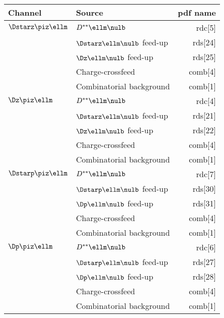 \documentclass[6pt]{article}
\begin{document}
\begin{tabular}{l l r}\\ \hline\hline
Channel          & Source  & pdf name\\ \hline
$\Dstarz\piz\ellm$ & $D^{**}\ellm\nulb$                & rdc[5] \\
              & $\Dstarz\ellm\nulb$ feed-up            & rds[24] \\
              & $\Dz\ellm\nulb$ feed-up                & rds[25] \\
              & Charge-crossfeed                       & comb[4] \\
              & Combinatorial background               & comb[1] \\ \hline
$\Dz\piz\ellm$     & $D^{**}\ellm\nulb$                & rdc[4] \\
              & $\Dstarz\ellm\nulb$ feed-up            & rds[21]  \\
              & $\Dz\ellm\nulb$ feed-up                & rds[22] \\
              & Charge-crossfeed                       & comb[4] \\
              & Combinatorial background               & comb[1] \\ \hline
$\Dstarp\piz\ellm$ & $D^{**}\ellm\nulb$                & rdc[7] \\
              & $\Dstarp\ellm\nulb$ feed-up            & rds[30] \\
              & $\Dp\ellm\nulb$ feed-up                & rds[31]   \\
              & Charge-crossfeed                       & comb[4]   \\
              & Combinatorial background               & comb[1] \\ \hline
$\Dp\piz\ellm$     & $D^{**}\ellm\nulb$                & rdc[6] \\
              & $\Dstarp\ellm\nulb$ feed-up            & rds[27] \\
              & $\Dp\ellm\nulb$ feed-up                & rds[28] \\
              & Charge-crossfeed                       & comb[4] \\
              & Combinatorial background               & comb[1] \\ \hline\hline
\end{tabular}
\end{document}
